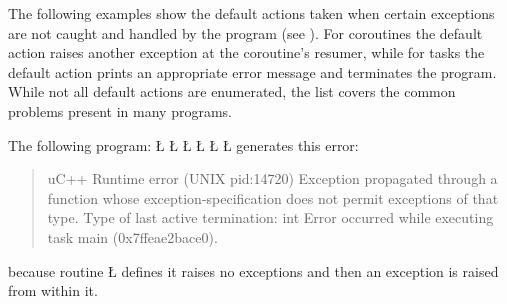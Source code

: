 \documentclass[openright,twoside]{report}
\begin{document}
The following examples show the default actions taken when certain exceptions are not caught and handled by the program (see ).
For coroutines the default action raises another exception at the coroutine's resumer, while for tasks the default action prints an appropriate error message and terminates the program.
While not all default actions are enumerated, the list covers the common problems present in many \uC programs.

The following program:
\LGinlinefalse\LGbegin\lgrinde
\L{}
\CE{}\L{\LB{}}
\L{\LB{\}}}
\L{}
\L{\LB{}}
\L{\LB{\}}}
\endlgrinde\LGend
generates this error:
\begin{quote}
\BGfont
uC++ Runtime error (UNIX pid:14720) Exception propagated through a function whose exception-specification does not permit exceptions of that type.
Type of last active termination: int
Error occurred while executing task main (0x7ffeae2bace0).
\end{quote}
because routine \LGinlinetrue\LGbegin\lgrinde\L{}\endlgrinde\LGend{} defines it raises no exceptions and then an exception is raised from within it.
\end{document}
